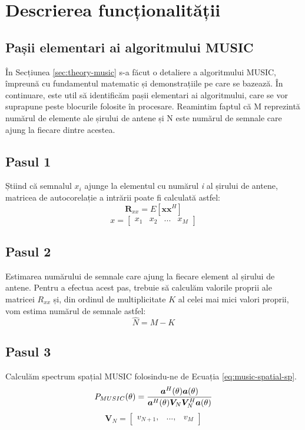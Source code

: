 \section{Descrierea funcționalității}
\label{sec:gr-doa-desc}

\subsection{Pașii elementari ai algoritmului MUSIC}
\label{ssec:music-steps}

În Secțiunea \ref{sec:theory-music} s-a făcut o detaliere a algoritmului
MUSIC, împreună cu fundamentul matematic și demonstrațiile pe care se bazează.
În continuare, este util să identificăm pașii elementari ai algoritmului,
care se vor suprapune peste blocurile folosite în procesare. Reamintim faptul că
M reprezintă numărul de elemente ale șirului de antene și N este numărul de
semnale care ajung la fiecare dintre acestea. 

\subsection*{Pasul 1}
\label{sssec:step1}
Știind că semnalul $x_i$ ajunge la elementul cu numărul \textit{i} al șirului de
antene, matricea de autocorelație a intrării poate fi calculată astfel:
\begin{equation}
    \bm{R}_{xx} = E[\bm{xx}^H]
\end{equation}
\begin{equation}
    x = \begin{bmatrix}x_1 & x_2 & ... & x_M \end{bmatrix}
\end{equation}

\subsection*{Pasul 2}
\label{sssec:step2}
Estimarea numărului de semnale care ajung la fiecare element al șirului de
antene. Pentru a efectua acest pas, trebuie să calculăm valorile proprii ale
matricei $R_{xx}$ și, din ordinul de multiplicitate $K$ al celei mai mici valori
proprii, vom estima numărul de semnale astfel:
\begin{equation}
    \hat{N} = M - K
\end{equation}

\subsection*{Pasul 3}
\label{sssec:step3}
Calculăm spectrum spațial MUSIC folosindu-ne de Ecuația \eqref{eq:music-spatial-sp}.
\begin{equation}
    P_{MUSIC}(\theta) =
        \frac{\bm{a}^H(\theta)\bm{a}(\theta)}
             {\bm{a}^H(\theta)\bm{V}_N\bm{V}_N^H\bm{a}(\theta)} \\
\label{eq:music-spatial-sp}
\end{equation}
\begin{equation}
    \bm{V}_N = \begin{bmatrix}v_{N+1}, & ..., & v_M \end{bmatrix}
\end{equation}

